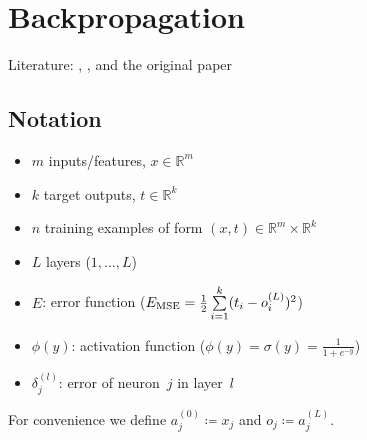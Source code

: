\section{Backpropagation}\label{sec:backpropagation}%
Literature: \cite[Chapter 4.5]{Mitchell1997}, \cite[Chapter 6.3]{Duda2000}, \cite{Patterson1997} and the original paper \cite{Rumelhart1986}

\subsection{Notation}
\begin{itemize}
\item $m$ inputs/features, $x \in \mathbb{R}^m$
\item $k$ target outputs, $t \in \mathbb{R}^k$
\item $n$ training examples of form $(x, t) \in \mathbb{R}^m \times \mathbb{R}^k$
\item $L$ layers ($1,\dots,L$)
\item $E$: error function (\eg $E_\text{MSE} = \frac{1}{2} \sum\limits_{i=1}^k (t_i - o_i^{(L)})^2$)
\item $\phi(y)$: activation function (\eg $\phi(y) = \sigma(y) = \frac{1}{1 + e^{-y}}$)
\item $\delta_j^{(l)}$: error of neuron~$j$ in layer~$l$
\end{itemize}

For convenience we define $a_j^{(0)}\coloneqq x_j$ and $o_j\coloneqq a_j^{(L)}$.

